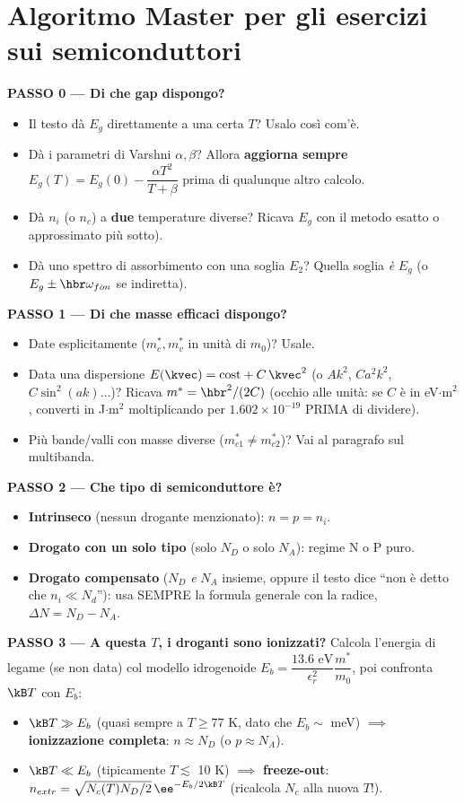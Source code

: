 \section{Algoritmo Master per gli esercizi sui semiconduttori}

\textbf{PASSO 0 --- Di che gap dispongo?}
\begin{itemize}
  \item Il testo dà $E_g$ direttamente a una certa $T$? Usalo così com'è.
  \item Dà i parametri di Varshni $\alpha,\beta$? Allora \textbf{aggiorna sempre} $E_g(T)=E_g(0)-\dfrac{\alpha T^2}{T+\beta}$ prima di qualunque altro calcolo.
  \item Dà $n_i$ (o $n_c$) a \textbf{due} temperature diverse? Ricava $E_g$ con il metodo esatto o approssimato pi\`u sotto).
  \item Dà uno spettro di assorbimento con una soglia $E_2$? Quella soglia \emph{è} $E_g$ (o $E_g\pm\hbr\omega_{fon}$ se indiretta).
\end{itemize}

\textbf{PASSO 1 --- Di che masse efficaci dispongo?}
\begin{itemize}
  \item Date esplicitamente ($m_c^*,m_v^*$ in unità di $m_0$)? Usale.
  \item Data una dispersione $E(\kvec)=\text{cost}+C\,\kvec^2$ (o $Ak^2$, $Ca^2k^2$, $C\sin^2(ak)$...)? Ricava $m^*=\hbr^2/(2C)$ (occhio alle unità: se $C$ è in eV$\cdot$m$^2$, converti in J$\cdot$m$^2$ moltiplicando per $1.602\times10^{-19}$ PRIMA di dividere).
  \item Più bande/valli con masse diverse ($m_{c1}^*\neq m_{c2}^*$)? Vai al paragrafo sul multibanda.
\end{itemize}

\textbf{PASSO 2 --- Che tipo di semiconduttore è?}
\begin{itemize}
  \item \textbf{Intrinseco} (nessun drogante menzionato): $n=p=n_i$.
  \item \textbf{Drogato con un solo tipo} (solo $N_D$ o solo $N_A$): regime N o P puro.
  \item \textbf{Drogato compensato} ($N_D$ \emph{e} $N_A$ insieme, oppure il testo dice ``non è detto che $n_i\ll N_d$''): usa SEMPRE la formula generale con la radice, $\Delta N=N_D-N_A$.
\end{itemize}

\textbf{PASSO 3 --- A questa $T$, i droganti sono ionizzati?}
Calcola l'energia di legame (se non data) col modello idrogenoide $E_b=\dfrac{13.6\text{ eV}}{\epsilon_r^2}\dfrac{m^*}{m_0}$, poi confronta $\kB T$ con $E_b$:
\begin{itemize}
  \item $\kB T\gg E_b$ (quasi sempre a $T\ge 77$ K, dato che $E_b\sim$ meV) $\implies$ \textbf{ionizzazione completa}: $n\approx N_D$ (o $p\approx N_A$).
  \item $\kB T\ll E_b$ (tipicamente $T\lesssim$ 10 K) $\implies$ \textbf{freeze-out}: $n_{extr}=\sqrt{N_c(T)N_D/2}\,\ee^{-E_b/2\kB T}$ (ricalcola $N_c$ alla nuova $T$!).
\end{itemize}

